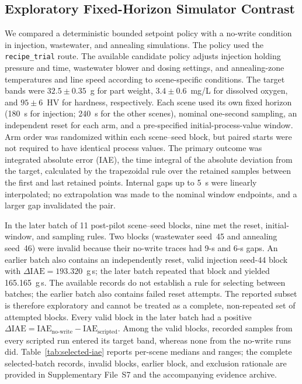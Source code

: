 \subsection{Exploratory Fixed-Horizon Simulator Contrast}
\label{sec:eval-optimization}
We compared a deterministic bounded setpoint policy with a no-write condition in injection, wastewater, and annealing simulations. The policy used the \texttt{recipe\_trial} route. The available candidate policy adjusts injection holding pressure and time, wastewater blower and dosing settings, and annealing-zone temperatures and line speed according to scene-specific conditions. The target bands were $32.5\pm0.35$~g for part weight, $3.4\pm0.6$~mg/L for dissolved oxygen, and $95\pm6$~HV for hardness, respectively. Each scene used its own fixed horizon (180~s for injection; 240~s for the other scenes), nominal one-second sampling, an independent reset for each arm, and a pre-specified initial-process-value window. Arm order was randomized within each scene--seed block, but paired starts were not required to have identical process values. The primary outcome was integrated absolute error (IAE), the time integral of the absolute deviation from the target, calculated by the trapezoidal rule over the retained samples between the first and last retained points. Internal gaps up to 5~s were linearly interpolated; no extrapolation was made to the nominal window endpoints, and a larger gap invalidated the pair.

In the later batch of 11 post-pilot scene--seed blocks, nine met the reset, initial-window, and sampling rules. Two blocks (wastewater seed~45 and annealing seed~46) were invalid because their no-write traces had 9-s and 6-s gaps. An earlier batch also contains an independently reset, valid injection seed-44 block with $\Delta\mathrm{IAE}=193.320$~g\,s; the later batch repeated that block and yielded 165.165~g\,s. The available records do not establish a rule for selecting between batches; the earlier batch also contains failed reset attempts. The reported subset is therefore exploratory and cannot be treated as a complete, non-repeated set of attempted blocks. Every valid block in the later batch had a positive $\Delta\mathrm{IAE}=\mathrm{IAE}_{\mathrm{no\text{-}write}}-\mathrm{IAE}_{\mathrm{scripted}}$. Among the valid blocks, recorded samples from every scripted run entered its target band, whereas none from the no-write runs did. Table~\ref{tab:selected-iae} reports per-scene medians and ranges; the complete selected-batch records, invalid blocks, earlier block, and exclusion rationale are provided in Supplementary File~S7 and the accompanying evidence archive.

